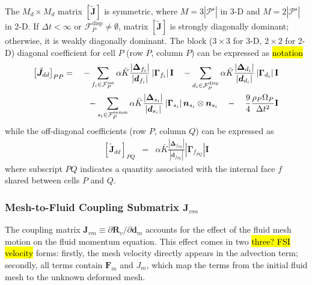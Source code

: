 \documentclass[sn-mathphys,Numbered]{sn-jnl}%
\newcommand{\bb}{\boldsymbol}
\begin{document}
The $M_d \times M_d$ matrix $\left[ \bb{\tilde{J}} \right]$ is symmetric, where $M = 3|\mathcal{P^s}|$ in 3-D and $M = 2|\mathcal{P^s}|$ in 2-D.
If $\Delta t < \infty$ or $\mathcal{F}^{\text{disp}}_P \neq \emptyset$, matrix $\left[ \bb{\tilde{J}} \right]$ is strongly diagonally dominant; otherwise, it is weakly diagonally dominant.
The block ($3\times3$ for 3-D, $2\times2$ for 2-D) diagonal coefficient for cell $P$ (row $P$, column $P$) can be expressed as \hl{notation}
\begin{eqnarray}
	 \left[ \tilde{\bb{J}}_{dd} \right]_{PP} &=&
		- \sum_{f_i \in \mathcal{F}^{\text{int}}_P}  \alpha \bar{K}
		\frac{ \left|\bb{\Delta}_{f_i} \right| }{\left|\bb{d}_{f_i}\right|}    \left|\bb{\Gamma}_{f_i}\right| \textbf{I} 
	    \quad-  \sum_{d_i \in \mathcal{F}^{\text{disp}}_P}  \alpha \bar{K}
		 \frac{ \left|\bb{\Delta}_{d_i} \right| }{\left|\bb{d}_{d_i}\right|} 
		\left|\bb{\Gamma}_{d_i}\right| \textbf{I} \notag \\
	 &&\quad - \sum_{s_i \in \mathcal{F}^{\text{symm}}_P} \alpha \bar{K}
		 \frac{ \left|\bb{\Delta}_{s_i} \right|}{\left|\bb{d}_{s_i}\right|}
		\left|\bb{\Gamma}_{s_i}\right|  \bb{n}_{s_i} \otimes \bb{n}_{s_i} 
	\quad - \quad \frac{9}{4}  \frac{\rho_P \Omega_P}{\Delta t^2} \textbf{I}
\end{eqnarray}
while the off-diagonal coefficients (row $P$, column $Q$) can be expressed as
\begin{eqnarray}
	\left[\tilde{\bb{J}}_{dd} \right] _{PQ} &=&
		\alpha \bar{K} \frac{ \left|\bb{\Delta}_{f_{PQ}} \right| }{\left|\bb{d}_{f_{PQ}}\right|} \left|\bb{\Gamma}_{f_{PQ}}\right| \textbf{I} 
\end{eqnarray}
where subscript $PQ$ indicates a quantity associated with the internal face $f$ shared between cells $P$ and $Q$.



\subsubsection[Mesh-to-Fluid Coupling Submatrix]{Mesh-to-Fluid Coupling Submatrix $\bb{J}_{vm}$} %
The coupling matrix $\bb{J}_{vm} \equiv \partial \bb{R}_{v}/\partial \bb{d}_m$ accounts for the effect of the fluid mesh motion on the fluid momentum equation.
This effect comes in two \hl{three? FSI velocity} forms: firstly, the mesh velocity directly appears in the advection term; secondly, all terms contain $\bb{F}_m$ and $J_m$, which map the terms from the initial fluid mesh to the unknown deformed mesh.
\end{document}
